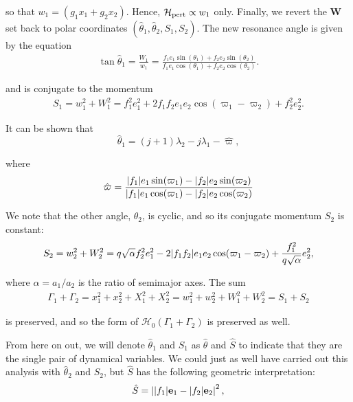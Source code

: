 \documentclass[usenatbib,onecolumn]{mnras}
\renewcommand{\v}[1]{\boldsymbol{ #1 }}
\DeclarePairedDelimiter{\abs}{|}{|}
\begin{document}
\noindent so that \(w_1 = (g_1 x_1 + g_2 x_2)\).  Hence,
\(\mathcal H_{\rm pert}\propto w_1\) only.  Finally, we revert the \(\v
W\) set back to polar coordinates
\((\hat\theta_1,\hat\theta_2,S_1,S_2)\). The new resonance angle is
given by the equation
\begin{align}
\label{hattheta}
  \tan\hat{\theta}_1 = \frac{W_1}{w_1} = \frac{f_1 e_1\sin(\theta_1)
  + f_2e_2\sin(\theta_2)}{f_1e_1\cos(\theta_1) + f_2e_2\cos(\theta_2)}.
\end{align}

\noindent
and is conjugate to the momentum
\begin{align}
  S_1 = w_1^2 + W_1^2 = f_1^2e_1^2
  + 2f_1f_2e_1e_2\cos(\varpi_1 - \varpi_2) + f_2^2e_2^2.
\end{align}

\noindent
It can be shown that
\begin{equation}
  \hat{\theta}_1 = (j+1)\lambda_2-j\lambda_1
  - \hat\varpi,
\end{equation}

\noindent
where
\begin{equation}
\hat\varpi = \frac{\abs{f_1} e_1\sin(\varpi_1) -
  \abs{f_2}e_2\sin(\varpi_2)} {\abs{f_1}e_1\cos(\varpi_1) -
  \abs{f_2}e_2\cos(\varpi_2)}
\end{equation}

\noindent
We note that the other angle, \(\hat\theta_2\),
is cyclic, and so its conjugate momentum \(S_2\) is constant:
\begin{align}
  S_2 = w_2^2 + W_2^2 = q\sqrt{\alpha}f_2^2e_1^2
-2\abs{f_1f_2}e_1e_2\cos(\varpi_1-\varpi_2) + \frac{f_1^2}{q\sqrt\alpha}e_2^2
,
\end{align}

\noindent
where \(\alpha=a_1/a_2\) is the ratio of semimajor axes.
The sum
\begin{align}
  \Gamma_1 +\Gamma_2 = x_1^2+x_2^2 + X_1^2 + X_2^2
  = w_1^2+w_2^2 + W_1^2 + W_2^2 = S_1 + S_2
\end{align}

\noindent
is preserved, and so the form of \(\mathcal H_0(\Gamma_1+\Gamma_2)\)
is preserved as well.

From here on out, we will denote \(\hat\theta_1\) and \(S_1\) as
\(\hat\theta\) and \(\hat S\) to indicate that they are the single pair of
dynamical variables.  We could just as well have carried out this
analysis with \(\hat\theta_2\) and \(S_2\), but \(\hat S\) has the following
geometric interpretation:
\begin{align}
  \hat S = \left\lvert \abs{f_1}\mathbf{e}_1 - \abs{f_2}\mathbf{e}_2\right\rvert^2,
\end{align}
\end{document}
